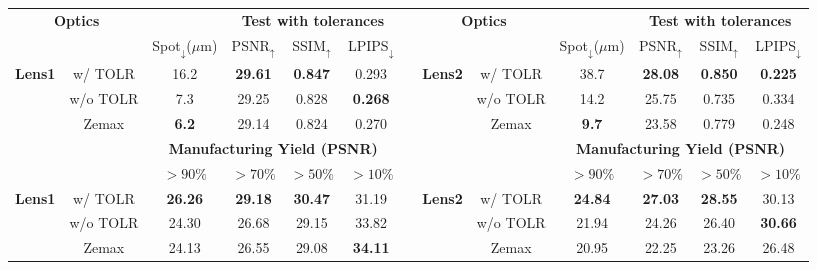 \renewcommand{\arraystretch}{1.3} 

\begin{tabularx}{\linewidth}{XccccccXccccc}
    \toprule
    \multicolumn{2}{c}{\multirow{2}{*}{\textbf{Optics}}} & & \multicolumn{3}{c}{\textbf{Test with tolerances}} & & \multicolumn{2}{c}{\multirow{2}{*}{\textbf{Optics}}} & & \multicolumn{3}{c}{\textbf{Test with tolerances}} \\
    \cmidrule{4-6} \cmidrule{11-13}
    \multicolumn{2}{c}{} & Spot$_\downarrow$($\mu$m) & PSNR$_\uparrow$ \cite{fardo2016formal} & SSIM$_\uparrow$ \cite{wang2004image} & LPIPS$_\downarrow$ \cite{zhang2018unreasonable} & & \multicolumn{2}{c}{} & Spot$_\downarrow$($\mu$m) & PSNR$_\uparrow$ & SSIM$_\uparrow$ & LPIPS$_\downarrow$ \\
    \midrule
    \multirow{3}{*}{\textbf{Lens1}}& w/ TOLR & 16.2 & \cellcolor{red!12.5} \textbf{29.61} & \cellcolor{red!12.5} \textbf{0.847} & 0.293 &  & \multirow{3}{*}{\textbf{Lens2}}& w/ TOLR & 38.7 & \cellcolor{red!12.5} \textbf{28.08} & \cellcolor{red!12.5} \textbf{0.850} & \cellcolor{red!12.5} \textbf{0.225} \\
    & w/o TOLR & 7.3 & 29.25 & 0.828 & \cellcolor{red!12.5}\textbf{0.268} & & & w/o TOLR & 14.2 & 25.75 & 0.735 & 0.334 \\
    & Zemax & \cellcolor{red!12.5} \textbf{6.2} & 29.14 & 0.824 & 0.270 &  &  & Zemax & \cellcolor{red!12.5} \textbf{9.7} & 23.58 & 0.779 & 0.248 \\
    \midrule
    \multirow{2}{*}{} & \multirow{2}{*}{} & \multicolumn{4}{c}{\textbf{Manufacturing Yield (PSNR)}}&  & \multirow{2}{*}{} & \multirow{2}{*}{} & \multicolumn{4}{c}{\textbf{Manufacturing Yield (PSNR)}} \\
    \cmidrule{3-6} \cmidrule{10-13}
     &  & $>90\%$ &  $>70\%$ &  $>50\%$ &  $>10\%$ &  & & &  $>90\%$ &  $>70\%$ &  $>50\%$ &  $>10\%$ \\
    \midrule
    \multirow{3}{*}{\textbf{Lens1}}& w/ TOLR & \cellcolor{red!12.5}\textbf{26.26} & \cellcolor{red!12.5}\textbf{29.18} & \cellcolor{red!12.5}\textbf{30.47} & 31.19 &  & \multirow{3}{*}{\textbf{Lens2}}& w/ TOLR & \cellcolor{red!12.5} \textbf{24.84} & \cellcolor{red!12.5}\textbf{27.03} & \cellcolor{red!12.5}\textbf{28.55} & 30.13 \\
    & w/o TOLR & 24.30 & 26.68 & 29.15 & 33.82& & & w/o TOLR & 21.94 & 24.26 & 26.40 & \cellcolor{red!12.5}\textbf{30.66} \\
    & Zemax & 24.13 & 26.55 & 29.08 & \cellcolor{red!12.5}\textbf{34.11} & &   & Zemax & 20.95 & 22.25 & 23.26 & 26.48 \\
    \bottomrule
\end{tabularx}